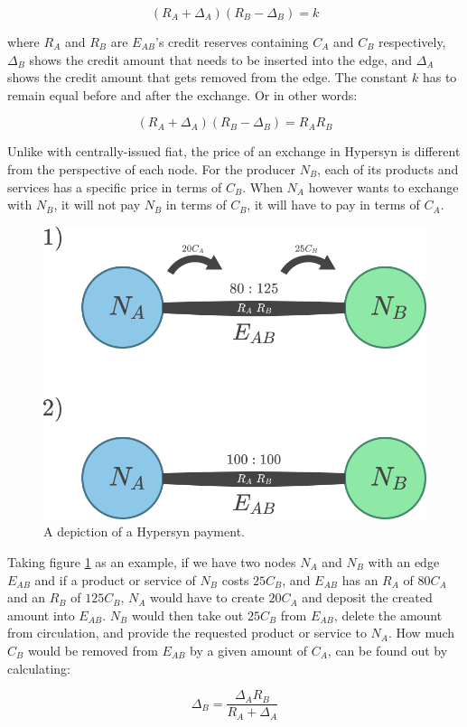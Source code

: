 \documentclass{article}
\begin{document}
\begin{equation}
\label{eq:const_prod1}
(R_A + \Delta_A)(R_B - \Delta_B) = k
\end{equation}

where $R_A$ and $R_B$ are $E_{AB}$'s credit reserves containing $C_A$ and $C_B$ respectively, $\Delta_B$ shows the credit amount that needs to be inserted into the edge, and $\Delta_A$ shows the credit amount that gets removed from the edge. The constant $k$ has to remain equal before and after the exchange. Or in other words:


\begin{equation}
\label{eq:const_prod2}
(R_A + \Delta_A)(R_B - \Delta_B) = R_A R_B
\end{equation}

Unlike with centrally-issued fiat, the price of an exchange in Hypersyn is different from the perspective of each node. For the producer $N_B$, each of its products and services has a specific price in terms of $C_B$. When $N_A$ however wants to exchange with $N_B$, it will not pay $N_B$ in terms of $C_B$, it will have to pay in terms of $C_A$.

\begin{figure}[h]
\centering\includegraphics[width=0.4\linewidth]{figures/hypersyn_payment.png}
\caption{A depiction of a Hypersyn payment.}
\label{fig:hypersyn_payment}
\end{figure}

Taking figure \ref{fig:hypersyn_payment} as an example, if we have two nodes $N_A$ and $N_B$ with an edge $E_{AB}$ and if a product or service of $N_B$ costs $25 C_B$, and $E_{AB}$ has an $R_A$ of $80 C_A$ and an $R_B$ of $125 C_B$, $N_A$ would have to create $20 C_A$ and deposit the created amount into $E_{AB}$. $N_B$ would then take out $25 C_B$ from $E_{AB}$, delete the amount from circulation, and provide the requested product or service to $N_A$. How much $C_B$ would be removed from $E_{AB}$ by a given amount of $C_A$, can be found out by calculating:

\begin{equation}
\label{eq:const_prod3}
 \Delta_B= \frac{\Delta_A R_B}{R_A + \Delta_A}
\end{equation}
\end{document}
